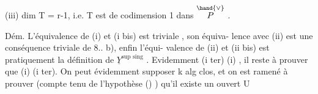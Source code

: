 (iii) dim T = r-1, i.e. T est de codimension 1 dans $\overset{\hand{\vee}}{P}$ .

Dém. L'équivalence de (i) et (i bis) est triviale , son équiva-%
lence avec (ii) est une conséquence triviale de 8.. b), enfin l'équi-%
valence de (ii) et (ii bis) est pratiquement la définition de
$\underline{Y}^{\text{sup sing}}$ . Evidemment (i ter) \hand{$\Longrightarrow$}(i) , il reste à prouver que (i)\hand{$\Longrightarrow$}
(i ter). On peut évidemment supposer k alg clos, et on est ramené à
prouver (compte tenu de l'hypothèse () ) qu'il existe un ouvert U\hand{$\neq\emptyset$}

